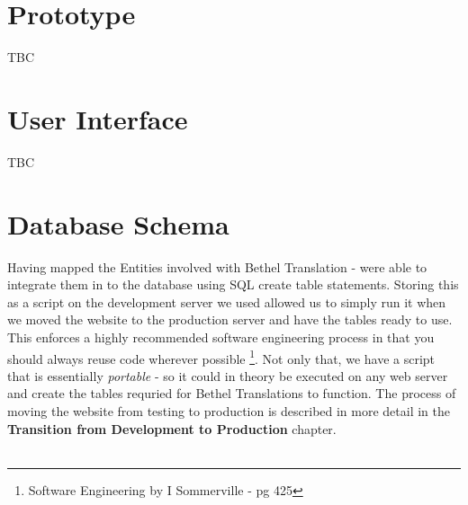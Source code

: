 \documentclass{l3proj}
\begin{document}
\section{Prototype}
TBC

\section{User Interface}
TBC

\section{Database Schema}
Having mapped the Entities involved with Bethel Translation -  were able to integrate them in to 
the database using SQL create table statements. Storing this as a script on the development server we used
allowed us to simply run it when we moved the website to the production server and have the tables ready to use.
This enforces a highly recommended software engineering process in that you should always reuse code wherever 
possible \footnote{Software Engineering by I Sommerville - pg 425}. Not only that, we have a script that is essentially
\textit{portable} - so it could in theory be executed on any web server and create the tables requried for
Bethel Translations to function. The process of moving the website from testing to production is described 
in more detail in the \textbf{Transition from Development to Production} chapter. \\
\\
\end{document}

